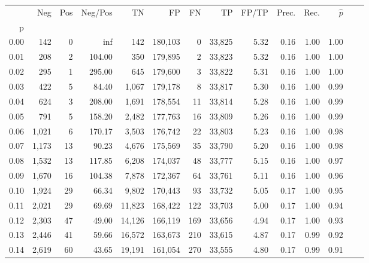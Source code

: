 \begin{tabular}{rrrrrrrrrrrrrr}
\toprule
{} &    Neg &  Pos & Neg/Pos &       TN &       FP &      FN &      TP & FP/TP & Prec. &  Rec. & $\hat{p}$ \\
p    &        &      &         &          &          &         &         &       &       &       &           \\
\midrule
0.00 &    142 &    0 &     inf &      142 &  180,103 &       0 &  33,825 &  5.32 &  0.16 &  1.00 &      1.00 \\
0.01 &    208 &    2 &  104.00 &      350 &  179,895 &       2 &  33,823 &  5.32 &  0.16 &  1.00 &      1.00 \\
0.02 &    295 &    1 &  295.00 &      645 &  179,600 &       3 &  33,822 &  5.31 &  0.16 &  1.00 &      1.00 \\
0.03 &    422 &    5 &   84.40 &    1,067 &  179,178 &       8 &  33,817 &  5.30 &  0.16 &  1.00 &      0.99 \\
0.04 &    624 &    3 &  208.00 &    1,691 &  178,554 &      11 &  33,814 &  5.28 &  0.16 &  1.00 &      0.99 \\
0.05 &    791 &    5 &  158.20 &    2,482 &  177,763 &      16 &  33,809 &  5.26 &  0.16 &  1.00 &      0.99 \\
0.06 &  1,021 &    6 &  170.17 &    3,503 &  176,742 &      22 &  33,803 &  5.23 &  0.16 &  1.00 &      0.98 \\
0.07 &  1,173 &   13 &   90.23 &    4,676 &  175,569 &      35 &  33,790 &  5.20 &  0.16 &  1.00 &      0.98 \\
0.08 &  1,532 &   13 &  117.85 &    6,208 &  174,037 &      48 &  33,777 &  5.15 &  0.16 &  1.00 &      0.97 \\
0.09 &  1,670 &   16 &  104.38 &    7,878 &  172,367 &      64 &  33,761 &  5.11 &  0.16 &  1.00 &      0.96 \\
0.10 &  1,924 &   29 &   66.34 &    9,802 &  170,443 &      93 &  33,732 &  5.05 &  0.17 &  1.00 &      0.95 \\
0.11 &  2,021 &   29 &   69.69 &   11,823 &  168,422 &     122 &  33,703 &  5.00 &  0.17 &  1.00 &      0.94 \\
0.12 &  2,303 &   47 &   49.00 &   14,126 &  166,119 &     169 &  33,656 &  4.94 &  0.17 &  1.00 &      0.93 \\
0.13 &  2,446 &   41 &   59.66 &   16,572 &  163,673 &     210 &  33,615 &  4.87 &  0.17 &  0.99 &      0.92 \\
0.14 &  2,619 &   60 &   43.65 &   19,191 &  161,054 &     270 &  33,555 &  4.80 &  0.17 &  0.99 &      0.91 \\

\end{tabular}
